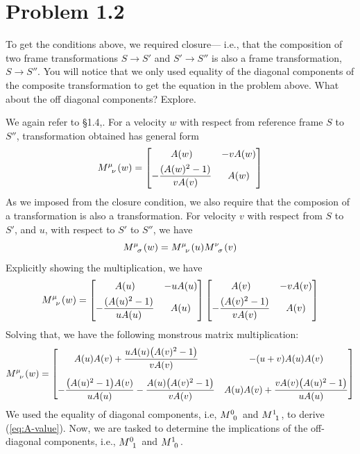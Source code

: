 \documentclass[12pt,a4paper]{article}
\begin{document}
	\section*{
		Problem 1.2
	}
	\begin{problem}
		To get the conditions above, we required closure--- i.e.,
		that the composition of two frame transformations $S\to S'$
		and $S'\to S''$ is also a frame transformation, $S\to S''$.
		You will notice that we only used equality of the diagonal 
		components of the composite transformation to get the equation
		in the problem above. What about the off diagonal components? Explore.
	\end{problem}
	\begin{solution_pset}
		We again refer to \S1.4,\cite{juan2026}. For a velocity $w$ with respect from reference frame $S$ 
		to $S''$, transformation obtained has general form
		\begin{equation}
			\label{eq:Mw}
			M\indices{^\mu_\nu}(w)
			=
			\bmqty{
				A(w) & -vA(w) \\[4pt]
				- \dfrac{(A(w)^2-1)}{vA(v)} 
					 & A(w)
			}
		\end{equation}
		As we imposed from the closure condition, we also require
		that the composion of a transformation is also a transformation.
		For velocity $v$ with respect from $S$ to $S'$, and $u$, with respect to 
		$S'$ to $S''$, we have
		\begin{equation}
			\label{eq:Mw-MvMu}
			\tensor{M}{^\mu_\sigma}(w) = \tensor{M}{^\mu_\nu}(u)\tensor{M}{^\nu_\sigma}(v)
		\end{equation}
		Explicitly showing the multiplication, we have
		\[
			\tensor{M}{^\mu_\nu}(w) = 
			\bmqty{
				A(u) & -uA(u) \\[4pt]
				- \dfrac{(A(u)^2-1)}{uA(u)} 
					 & A(u)
			}
			\bmqty{
				A(v) & -vA(v) \\[4pt]
				- \dfrac{(A(v)^2-1)}{vA(v)} 
					 & A(v)
			}
		\]
		Solving that, we have the following monstrous matrix multiplication:
		{
			\begin{equation*}
			\tensor{M}{^\mu_\nu}(w) = 
			\begin{bmatrix}
				A(u)A(v) + \dfrac{uA(u)\bigl(A(v)^2-1\bigr)}{vA(v)} & 
				-(u+v)A(u)A(v) \\[14pt]
				-\dfrac{\bigl(A(u)^2-1\bigr)A(v)}{uA(u)} - \dfrac{A(u)\bigl(A(v)^2-1\bigr)}{vA(v)} & 
				A(u)A(v) + \dfrac{vA(v)\bigl(A(u)^2-1\bigr)}{uA(u)}
			\end{bmatrix}
			\end{equation*}
		}
		We used the equality of diagonal components, i.e, $M\indices{^0_0}$ and $M\indices{^1_1}$, 
		to derive (\ref{eq:A-value}). Now, we are tasked to determine the implications
		of the off-diagonal components, i.e., $M\indices{^0_1}$ and $M\indices{^1_0}$.


\end{solution_pset}
\end{document}
